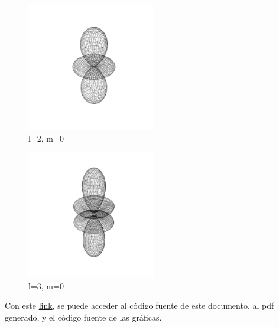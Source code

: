 \documentclass[twocolumn]{article}
\begin{document}
\begin{figure}[h!]
    \caption{l=2, m=0}
    \includegraphics[width=0.5\textwidth]{Y2-0.png}
\end{figure}

\begin{figure}[h!]
    \caption{l=3, m=0}
    \includegraphics[width=0.5\textwidth]{Y3-0.png}
\end{figure}


Con este \href{https://github.com/lldddv2/Atomo_de_Hidrogeno}{link}, se puede acceder al código fuente de este documento, al pdf generado, y el código fuente de las gráficas.
\end{document}
